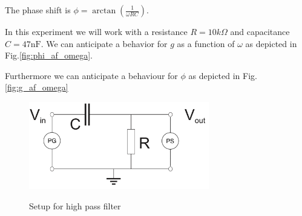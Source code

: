 \documentclass[../main/main.tex]{subfiles}
\begin{document}
The phase shift is \( \phi = \arctan( \frac{1}{ \omega RC })\).

In this experiment we will work with a resistance \( R = 10 k\Omega \) and capacitance \( C = 47 \si{\nano\farad} \).
We can anticipate a behavior for \( g \) as a function of \( \omega \) as depicted in Fig.\ref{fig:phi_af_omega}.

Furthermore we can anticipate a behaviour for \( \phi \) as depicted in Fig.\ref{fig:g_af_omega}

\begin{figure}[!ht]
  \centering
    \includegraphics[width=0.7\textwidth]{../img/setup.png}
    \label{fig:setup}
    \caption{Setup for high pass filter}
\end{figure}
\end{document}
